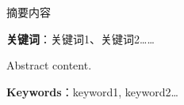 \newpage
{}
摘要内容

\bigskip
\noindent \textbf{关键词}：关键词1、关键词2……

\newpage
{}
Abstract content.

\bigskip
\noindent \textbf{Keywords}：keyword1, keyword2…